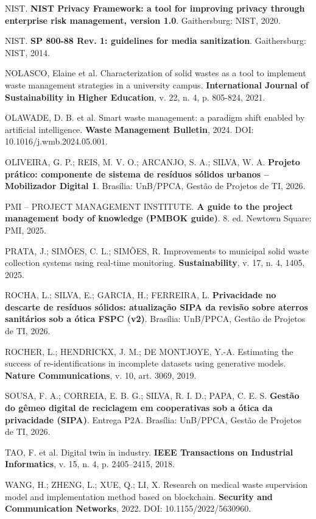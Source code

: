 \documentclass[12pt,a4paper,article,oneside,english,brazil]{abntex2}
\begin{document}
NIST. \textbf{NIST Privacy Framework: a tool for improving privacy through enterprise risk management, version 1.0}. Gaithersburg: NIST, 2020.

NIST. \textbf{SP 800-88 Rev. 1: guidelines for media sanitization}. Gaithersburg: NIST, 2014.

NOLASCO, Elaine et al. Characterization of solid wastes as a tool to implement waste management strategies in a university campus. \textbf{International Journal of Sustainability in Higher Education}, v. 22, n. 4, p. 805-824, 2021.

OLAWADE, D. B. et al. Smart waste management: a paradigm shift enabled by artificial intelligence. \textbf{Waste Management Bulletin}, 2024. DOI: 10.1016/j.wmb.2024.05.001.

OLIVEIRA, G. P.; REIS, M. V. O.; ARCANJO, S. A.; SILVA, W. A. \textbf{Projeto prático: componente de sistema de resíduos sólidos urbanos -- Mobilizador Digital 1}. Brasília: UnB/PPCA, Gestão de Projetos de TI, 2026.

PMI -- PROJECT MANAGEMENT INSTITUTE. \textbf{A guide to the project management body of knowledge (PMBOK guide)}. 8. ed. Newtown Square: PMI, 2025.

PRATA, J.; SIMÕES, C. L.; SIMÕES, R. Improvements to municipal solid waste collection systems using real-time monitoring. \textbf{Sustainability}, v. 17, n. 4, 1405, 2025.

ROCHA, L.; SILVA, E.; GARCIA, H.; FERREIRA, L. \textbf{Privacidade no descarte de resíduos sólidos: atualização SIPA da revisão sobre aterros sanitários sob a ótica FSPC (v2)}. Brasília: UnB/PPCA, Gestão de Projetos de TI, 2026.

ROCHER, L.; HENDRICKX, J. M.; DE MONTJOYE, Y.-A. Estimating the success of re-identifications in incomplete datasets using generative models. \textbf{Nature Communications}, v. 10, art. 3069, 2019.

SOUSA, F. A.; CORREIA, E. B. G.; SILVA, R. I. D.; PAPA, C. E. S. \textbf{Gestão do gêmeo digital de reciclagem em cooperativas sob a ótica da privacidade (SIPA)}. Entrega P2A. Brasília: UnB/PPCA, Gestão de Projetos de TI, 2026.

TAO, F. et al. Digital twin in industry. \textbf{IEEE Transactions on Industrial Informatics}, v. 15, n. 4, p. 2405--2415, 2018.

WANG, H.; ZHENG, L.; XUE, Q.; LI, X. Research on medical waste supervision model and implementation method based on blockchain. \textbf{Security and Communication Networks}, 2022. DOI: 10.1155/2022/5630960.

\endgroup
\end{document}
